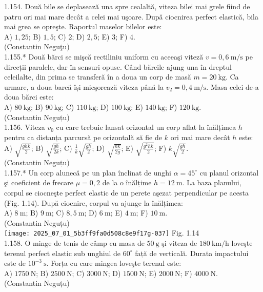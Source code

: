 1.154. Două bile se deplasează una spre cealaltă, viteza bilei mai grele fiind de patru ori mai mare decât a celei mai uşoare. După ciocnirea perfect elastică, bila mai grea se opreşte. Raportul maselor bilelor este:\\ A) $1,25$; B) $1,5$; C) $2$; D) $2,5$; E) $3$; F) $4$.\\ (Constantin Neguţu)\\

1.155.* Două bărci se mişcă rectiliniu uniform cu aceeaşi viteză $v=0,6 \mathrm{~m} / \mathrm{s}$ pe direcții paralele, dar în sensuri opuse. Când bărcile ajung una în dreptul celeilalte, din prima se transferă în a doua un corp de masă $m=20 \mathrm{~kg}$. Ca urmare, a doua barcă își micşorează viteza până la $v_{2}=0,4 \mathrm{~m} / \mathrm{s}$. Masa celei de-a doua bărci este:\\ A) $80 \mathrm{~kg}$; B) $90 \mathrm{~kg}$; C) $110 \mathrm{~kg}$; D) $100 \mathrm{~kg}$; E) $140 \mathrm{~kg}$; F) $120 \mathrm{~kg}$.\\ (Constantin Neguțu)\\

1.156. Viteza $v_{0}$ cu care trebuie lansat orizontal un corp aflat la înălțimea $h$ pentru ca distanța parcursă pe orizontală să fie de $k$ ori mai mare decât $h$ este:\\ A) $\sqrt{\frac{g h k}{2}}$; B) $\sqrt{\frac{g h}{2 k}}$; C) $\frac{1}{k} \sqrt{\frac{g h}{2}}$; D) $\sqrt{\frac{h k}{2 g}}$; E) $\sqrt{\frac{g^{2} h k}{2}}$; F) $k \sqrt{\frac{g h}{2}}$.\\ (Constantin Neguțu)\\

1.157.* Un corp alunecă pe un plan înclinat de unghi $\alpha=45^{\circ}$ cu planul orizontal şi coeficient de frecare $\mu=0,2$ de la o înălțime $h=12 \mathrm{~m}$. La baza planului, corpul se ciocneşte perfect elastic de un perete aşezat perpendicular pe acesta (Fig. 1.14). După ciocnire, corpul va ajunge la înălțimea:\\ A) $8 \mathrm{~m}$; B) $9 \mathrm{~m}$; C) $8,5 \mathrm{~m}$; D) $6 \mathrm{~m}$; E) $4 \mathrm{~m}$; F) $10 \mathrm{~m}$.\\ (Constantin Neguțu)\\ \texttt{[image: 2025\_07\_01\_5b3ff9fa0d508c8e9f17g-037]} Fig. 1.14\\

1.158. O minge de tenis de câmp cu masa de $50 \mathrm{~g}$ şi viteza de $180 \mathrm{~km} / \mathrm{h}$ loveşte terenul perfect elastic sub unghiul de $60^{\circ}$ față de verticală. Durata impactului este de $10^{-3} \mathrm{~s}$. Forța cu care mingea loveşte terenul este:\\ A) $1750 \mathrm{~N}$; B) $2500 \mathrm{~N}$; C) $3000 \mathrm{~N}$; D) $1500 \mathrm{~N}$; E) $2000 \mathrm{~N}$; F) $4000 \mathrm{~N}$.\\ (Constantin Neguțu)\\

